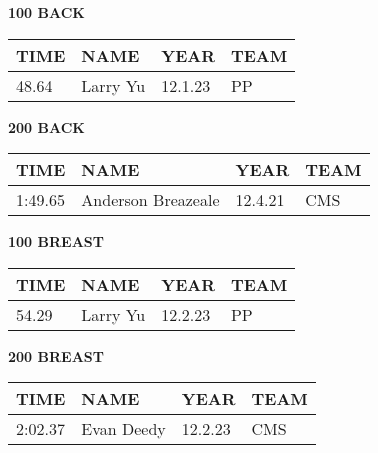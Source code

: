 \begin{minipage}[t]{0.48\textwidth}
\centering
\textbf{100 BACK}\\[0.05cm]
\begin{tabular}{@{}p{1.8cm}p{2.8cm}p{1.2cm}p{1.4cm}@{}}
\hline
\textbf{TIME} & \textbf{NAME} & \textbf{YEAR} & \textbf{TEAM} \\
\hline
48.64 & Larry Yu & 12.1.23 & PP \\
\hline
\end{tabular}
\end{minipage}\hfill
\begin{minipage}[t]{0.48\textwidth}
\centering
\textbf{200 BACK}\\[0.05cm]
\begin{tabular}{@{}p{1.8cm}p{2.8cm}p{1.2cm}p{1.4cm}@{}}
\hline
\textbf{TIME} & \textbf{NAME} & \textbf{YEAR} & \textbf{TEAM} \\
\hline
1:49.65 & Anderson Breazeale & 12.4.21 & CMS \\
\hline
\end{tabular}
\end{minipage}

\vspace{0.4cm}

\begin{minipage}[t]{0.48\textwidth}
\centering
\textbf{100 BREAST}\\[0.05cm]
\begin{tabular}{@{}p{1.8cm}p{2.8cm}p{1.2cm}p{1.4cm}@{}}
\hline
\textbf{TIME} & \textbf{NAME} & \textbf{YEAR} & \textbf{TEAM} \\
\hline
54.29 & Larry Yu & 12.2.23 & PP \\
\hline
\end{tabular}
\end{minipage}\hfill
\begin{minipage}[t]{0.48\textwidth}
\centering
\textbf{200 BREAST}\\[0.05cm]
\begin{tabular}{@{}p{1.8cm}p{2.8cm}p{1.2cm}p{1.4cm}@{}}
\hline
\textbf{TIME} & \textbf{NAME} & \textbf{YEAR} & \textbf{TEAM} \\
\hline
2:02.37 & Evan Deedy & 12.2.23 & CMS \\
\hline
\end{tabular}
\end{minipage}

\vspace{0.4cm}

